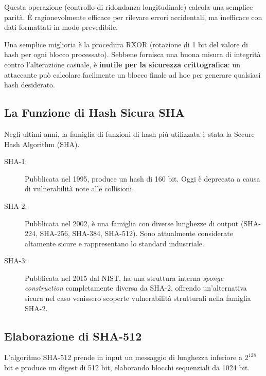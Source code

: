 Questa operazione (controllo di ridondanza longitudinale) calcola una semplice parità. È ragionevolmente efficace per rilevare errori accidentali, ma inefficace con dati formattati in modo prevedibile.

\begin{warnbox}
Una semplice miglioria è la procedura RXOR (rotazione di 1 bit del valore di hash per ogni blocco processato). Sebbene fornisca una buona misura di integrità contro l'alterazione casuale, è \textbf{inutile per la sicurezza crittografica}: un attaccante può calcolare facilmente un blocco finale ad hoc per generare qualsiasi hash desiderato.
\end{warnbox}

\subsection{La Funzione di Hash Sicura SHA}
Negli ultimi anni, la famiglia di funzioni di hash più utilizzata è stata la Secure Hash Algorithm (SHA).
\begin{description}
    \item[SHA-1:] Pubblicata nel 1995, produce un hash di 160 bit. Oggi è deprecata a causa di vulnerabilità note alle collisioni.
    \item[SHA-2:] Pubblicata nel 2002, è una famiglia con diverse lunghezze di output (SHA-224, SHA-256, SHA-384, SHA-512). Sono attualmente considerate altamente sicure e rappresentano lo standard industriale.
    \item[SHA-3:] Pubblicata nel 2015 dal NIST, ha una struttura interna \textit{sponge construction} completamente diversa da SHA-2, offrendo un'alternativa sicura nel caso venissero scoperte vulnerabilità strutturali nella famiglia SHA-2.
\end{description}

\subsection{Elaborazione di SHA-512}
L'algoritmo SHA-512 prende in input un messaggio di lunghezza inferiore a $2^{128}$ bit e produce un digest di 512 bit, elaborando blocchi sequenziali da 1024 bit.

